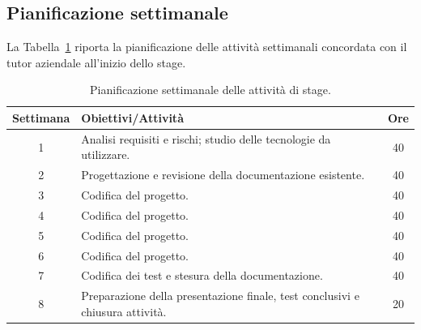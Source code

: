 \subsection{Pianificazione settimanale}
La Tabella~\ref{tab:pianificazione_settimanale} riporta la pianificazione delle attività settimanali concordata con il tutor aziendale all’inizio dello stage.
\begin{table}[htbp]
    \centering
    \renewcommand{\arraystretch}{1.2}
    \begin{tabular}{|c|p{8cm}|c|}
    \hline
    \textbf{Settimana} & \textbf{Obiettivi/Attività} & \textbf{Ore}\\ \hline
    1 & Analisi requisiti e rischi; studio delle tecnologie da utilizzare. & 40\\ \hline
    2 & Progettazione e revisione della documentazione esistente. & 40\\ \hline
    3 & Codifica del progetto. & 40\\ \hline
    4 & Codifica del progetto. & 40\\ \hline
    5 & Codifica del progetto. & 40\\ \hline
    6 & Codifica del progetto. & 40\\ \hline
    7 & Codifica dei test e stesura della documentazione. & 40\\ \hline
    8 & Preparazione della presentazione finale, test conclusivi e chiusura attività. & 20\\ \hline
    \end{tabular}
    \caption{Pianificazione settimanale delle attività di stage.}
    \label{tab:pianificazione_settimanale}
\end{table}
\newpage
